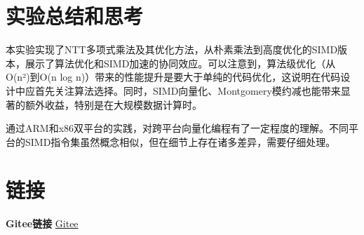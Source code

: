 \documentclass[a4paper]{article}
\begin{document}
\section{实验总结和思考}
本实验实现了NTT多项式乘法及其优化方法，从朴素乘法到高度优化的SIMD版本，展示了算法优化和SIMD加速的协同效应。可以注意到，算法级优化（从O(n²)到O(n log n)）带来的性能提升是要大于单纯的代码优化，这说明在代码设计中应首先关注算法选择。同时，SIMD向量化、Montgomery模约减也能带来显著的额外收益，特别是在大规模数据计算时。

通过ARM和x86双平台的实践，对跨平台向量化编程有了一定程度的理解。不同平台的SIMD指令集虽然概念相似，但在细节上存在诸多差异，需要仔细处理。

\section{链接}
\textbf{Gitee链接}  \href{https://gitee.com/sky_whale/parallel-programming-with-nku}{Gitee}
\end{document}

